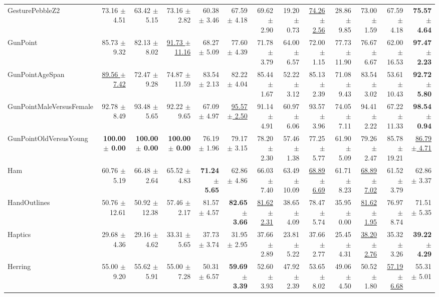 \begin{landscape}
\begin{longtable}{lrrrrrrrrrrrr}
GesturePebbleZ2 & 73.16 $\pm$ 4.51 & 63.42 $\pm$ 5.15 & 73.16 $\pm$ 2.82 & 60.38 $\pm$ 3.46 & 67.59 $\pm$ 4.18 & 69.62 $\pm$ 2.90 & 19.20 $\pm$ 0.73 & \underline{74.26 $\pm$ 2.56} & 28.86 $\pm$ 9.85 & 73.00 $\pm$ 1.59 & 67.59 $\pm$ 4.18 & \textbf{75.57 $\pm$ 4.64} \\
GunPoint & 85.73 $\pm$ 9.32 & 82.13 $\pm$ 8.02 & \underline{91.73 $\pm$ 11.16} & 68.27 $\pm$ 5.09 & 77.60 $\pm$ 4.39 & 71.78 $\pm$ 3.79 & 64.00 $\pm$ 6.57 & 72.00 $\pm$ 1.15 & 77.73 $\pm$ 11.90 & 76.67 $\pm$ 6.67 & 62.00 $\pm$ 16.53 & \textbf{97.47 $\pm$ 2.23} \\
GunPointAgeSpan & \underline{89.56 $\pm$ 7.42} & 72.47 $\pm$ 9.28 & 74.87 $\pm$ 11.59 & 83.54 $\pm$ 2.13 & 82.22 $\pm$ 4.04 & 85.44 $\pm$ 1.67 & 52.22 $\pm$ 3.12 & 85.13 $\pm$ 2.39 & 71.08 $\pm$ 9.43 & 83.54 $\pm$ 3.02 & 53.61 $\pm$ 10.43 & \textbf{92.72 $\pm$ 5.80} \\
GunPointMaleVersusFemale & 92.78 $\pm$ 8.49 & 93.48 $\pm$ 5.65 & 92.22 $\pm$ 9.65 & 67.09 $\pm$ 4.97 & \underline{95.57 $\pm$ 2.50} & 91.14 $\pm$ 4.91 & 60.97 $\pm$ 6.06 & 93.57 $\pm$ 3.96 & 74.05 $\pm$ 7.11 & 94.41 $\pm$ 2.22 & 67.22 $\pm$ 11.33 & \textbf{98.54 $\pm$ 0.94} \\
GunPointOldVersusYoung & \textbf{100.00 $\pm$ 0.00} & \textbf{100.00 $\pm$ 0.00} & \textbf{100.00 $\pm$ 0.00} & 76.19 $\pm$ 1.96 & 79.17 $\pm$ 3.15 & 78.20 $\pm$ 2.30 & 57.46 $\pm$ 1.38 & 77.25 $\pm$ 5.77 & 61.90 $\pm$ 5.09 & 79.26 $\pm$ 2.47 & 85.78 $\pm$ 19.21 & \underline{86.79 $\pm$ 4.71} \\
Ham & 60.76 $\pm$ 5.19 & 66.48 $\pm$ 2.64 & 65.52 $\pm$ 4.83 & \textbf{71.24 $\pm$ 5.65} & 62.86 $\pm$ 4.86 & 66.03 $\pm$ 7.40 & 63.49 $\pm$ 10.09 & \underline{68.89 $\pm$ 6.69} & 61.71 $\pm$ 8.23 & \underline{68.89 $\pm$ 7.02} & 61.52 $\pm$ 3.79 & 62.86 $\pm$ 3.37 \\
HandOutlines & 50.76 $\pm$ 12.61 & 50.92 $\pm$ 12.38 & 57.46 $\pm$ 2.17 & 81.57 $\pm$ 4.57 & \textbf{82.65 $\pm$ 3.66} & \underline{81.62 $\pm$ 2.31} & 38.65 $\pm$ 4.09 & 78.47 $\pm$ 5.74 & 35.95 $\pm$ 0.00 & \underline{81.62 $\pm$ 1.95} & 76.97 $\pm$ 8.74 & 71.51 $\pm$ 5.35 \\
Haptics & 29.68 $\pm$ 4.36 & 29.16 $\pm$ 4.62 & 33.31 $\pm$ 5.65 & 37.73 $\pm$ 3.74 & 31.95 $\pm$ 2.95 & 37.66 $\pm$ 2.89 & 23.81 $\pm$ 5.22 & 37.66 $\pm$ 2.77 & 25.45 $\pm$ 4.31 & \underline{38.20 $\pm$ 2.76} & 35.32 $\pm$ 3.26 & \textbf{39.22 $\pm$ 4.29} \\
Herring & 55.00 $\pm$ 9.20 & 55.62 $\pm$ 5.91 & 55.00 $\pm$ 7.28 & 50.31 $\pm$ 6.57 & \textbf{59.69 $\pm$ 3.39} & 52.60 $\pm$ 3.93 & 47.92 $\pm$ 2.39 & 53.65 $\pm$ 8.02 & 49.06 $\pm$ 4.50 & 50.52 $\pm$ 1.80 & \underline{57.19 $\pm$ 6.68} & 55.31 $\pm$ 5.01 \\

\end{longtable}
\end{landscape}
